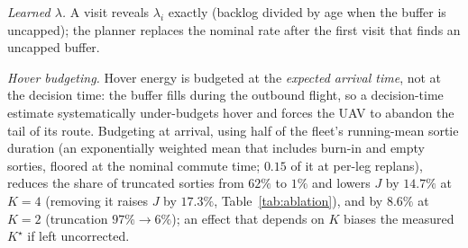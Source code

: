 \documentclass[journal,outdir=./]{IEEEtran}
\begin{document}
\textit{Learned $\lambda$.} A visit reveals $\lambda_i$ exactly (backlog divided by age when the buffer is uncapped); the planner replaces the nominal rate after the first visit that finds an uncapped buffer.

\textit{Hover budgeting.} Hover energy is budgeted at the \emph{expected arrival time}, not at the decision time: the buffer fills during the outbound flight, so a decision-time estimate systematically under-budgets hover and forces the UAV to abandon the tail of its route. Budgeting at arrival, using half of the fleet's running-mean sortie duration (an exponentially weighted mean that includes burn-in and empty sorties, floored at the nominal commute time; $0.15$ of it at per-leg replans), reduces the share of truncated sorties from $62\%$ to $1\%$ and lowers $J$ by $14.7\%$ at $K=4$ (removing it raises $J$ by $17.3\%$, Table~\ref{tab:ablation}), and by $8.6\%$ at $K=2$ (truncation $97\%\to6\%$); an effect that depends on $K$ biases the measured $K^{\star}$ if left uncorrected.
\end{document}
